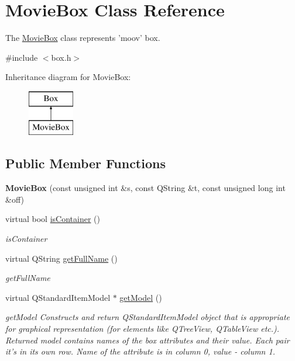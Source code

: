 \hypertarget{class_movie_box}{\section{Movie\-Box Class Reference}
\label{class_movie_box}
}


The \hyperlink{class_movie_box}{Movie\-Box} class represents 'moov' box.  




{\ttfamily \#include $<$box.\-h$>$}

Inheritance diagram for Movie\-Box\-:\begin{figure}[H]
\begin{center}
\leavevmode
\includegraphics[height=2.000000cm]{class_movie_box}
\end{center}
\end{figure}
\subsection*{Public Member Functions}
\begin{DoxyCompactItemize}
\item 
\hypertarget{class_movie_box_aee45e25c2a711842ae029643d4870c31}{{\bfseries Movie\-Box} (const unsigned int \&s, const Q\-String \&t, const unsigned long int \&off)}\label{class_movie_box_aee45e25c2a711842ae029643d4870c31}

\item 
virtual bool \hyperlink{class_movie_box_af75bd55df36733f36e9c9c3bde448d93}{is\-Container} ()
\begin{DoxyCompactList}\small\item\em is\-Container \end{DoxyCompactList}\item 
virtual Q\-String \hyperlink{class_movie_box_a68e2952ae634633bbccaf61c749fa33f}{get\-Full\-Name} ()
\begin{DoxyCompactList}\small\item\em get\-Full\-Name \end{DoxyCompactList}\item 
virtual Q\-Standard\-Item\-Model $\ast$ \hyperlink{class_movie_box_a48d5f8248231d692efb16c7fdab53b31}{get\-Model} ()
\begin{DoxyCompactList}\small\item\em get\-Model Constructs and return Q\-Standard\-Item\-Model object that is appropriate for graphical representation (for elements like Q\-Tree\-View, Q\-Table\-View etc.). Returned model contains names of the box attributes and their value. Each pair it's in its own row. Name of the attribute is in column 0, value -\/ column 1. \end{DoxyCompactList}\end{DoxyCompactItemize}

